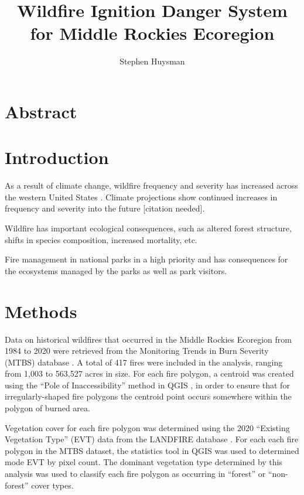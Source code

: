 \documentclass{article}
\author{Stephen Huysman}
\title{Wildfire Ignition Danger System for Middle Rockies Ecoregion}
\begin{document}
\maketitle

\section{Abstract}

\section{Introduction}

As a result of climate change, wildfire frequency and severity has increased across the western United States \citep{rileyRelationshipLargeFire2013a}.  Climate projections show continued increases in frequency and severity into the future [citation needed].

Wildfire has important ecological consequences, such as altered forest structure, shifts in species composition, increased mortality, etc.

Fire management in national parks in a high priority and has consequences for the ecosystems managed by the parks as well as park visitors.


\section{Methods}

Data on historical wildfires that occurred in the Middle Rockies Ecoregion from 1984 to 2020 were retrieved from the Monitoring Trends in Burn Severity (MTBS) database \citep{eidenshinkProjectMonitoringTrends2007}.  A total of 417 fires were included in the analysis, ranging from 1,003 to 563,527 acres in size.  For each fire polygon, a centroid was created using the ``Pole of Inaccessibility'' method in QGIS \citep{QGIS_software}, in order to ensure that for irregularly-shaped fire polygons the centroid point occurs somewhere within the polygon of burned area.  

Vegetation cover for each fire polygon was determined using the 2020 ``Existing Vegetation Type'' (EVT) data from the LANDFIRE database \citep{rollinsLANDFIRENationallyConsistent2009}.  For each each fire polygon in the MTBS dataset, the statistics tool in QGIS was used to determined mode EVT by pixel count.  The dominant vegetation type determined by this analysis was used to classify each fire polygon as occurring in ``forest'' or ``non-forest'' cover types.  
\end{document}
